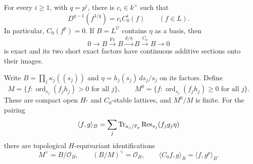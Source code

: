 \begin{lemma}
\label{lem:Cartier-traces}
For every $i\ge1$, with $q=p^i$, there is $c_i\in k^\times$ such that
\begin{equation}
 \label{eq:Cartier-distribution-trace}
 D^{q-1}(f^{1/q})=c_i C_0^i(f)\qquad(f\in L).
\end{equation}
In particular, $C_0(f^p)=0$.  If $B=L^U$ contains $\eta$ as a
basis, then
\begin{equation}
 \label{eq:Cartier-exact-sequence}
 0\longrightarrow B\xrightarrow{\mathrm{Fr}}B
 \xrightarrow{d/\eta}B\xrightarrow{C_0}B\longrightarrow0
\end{equation}
is exact and its two short exact factors have continuous additive
sections onto their images.

Write $B=\prod_j\kappa_j((s_j))$ and
$\eta=h_j(s_j)\,ds_j/s_j$ on its factors.  Define
\[
 M=\{f:\operatorname{ord}_{s_j}(f_jh_j)>0\text{ for all }j\},
 \qquad
 M^0=\{f:\operatorname{ord}_{s_j}(f_jh_j)\ge0\text{ for all }j\}.
\]
These are compact open $H$- and $C_0$-stable lattices, and $M^0/M$
is finite.  For the pairing
\begin{equation}
 \label{eq:residue-pairing}
 \langle f,g\rangle_B
 =\sum_j\operatorname{Tr}_{\kappa_j/\mathbb F_p}
             \operatorname{Res}_{s_j}(f_jg_j\eta)
\end{equation}
there are topological $H$-equivariant identifications
\begin{equation}
 \label{eq:residue-lattice-duals}
 M^\vee=B/\mathcal O_B,\qquad
 (B/M)^\vee=\mathcal O_B,\qquad
 \langle C_0f,g\rangle_B=\langle f,g^p\rangle_B.
\end{equation}
\end{lemma}

